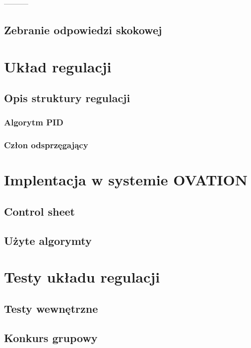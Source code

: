\documentclass{mwrep}
\begin{document}
 
  -----------
  

\section{Zebranie odpowiedzi skokowej}
\label{OdpowiedzSkokowa}

\chapter{Układ regulacji}
\label{UkladRegulacji}

\section{Opis struktury regulacji}
\label{OpisStruktury}

\subsection{Algorytm PID}
\label{PID}

\subsection{Człon odsprzęgający}
\label{Odsprzeganie}

\chapter{Implentacja w systemie OVATION}
\label{OVATION}

\section{Control sheet}
\label{ControlSheet}

\section{Użyte algorymty}
\label{AlgorytmyOVATION}

\chapter{Testy układu regulacji}
\label{Testy}

\section{Testy wewnętrzne}
\label{TestyWewnetrzne}

\section{Konkurs grupowy}
\label{Konkurs}
\end{document}
